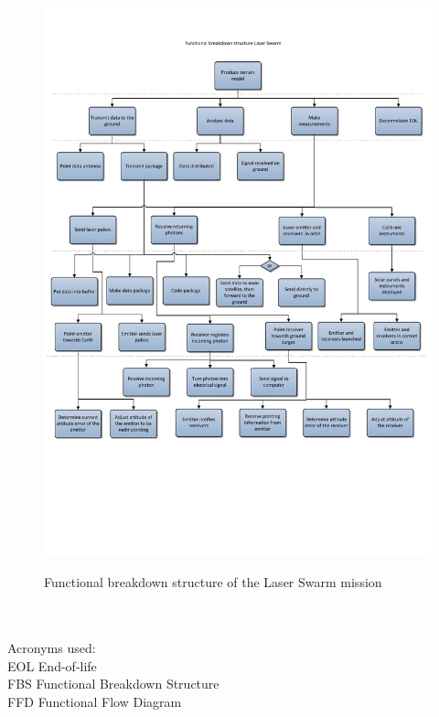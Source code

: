 \begin{figure}
\begin{center}
\includegraphics[trim = 0mm 60mm 0mm 0mm, clip, scale=0.7]{img/pic_FBS.pdf}
\label{pic_FBS}
\caption{Functional breakdown structure of the Laser Swarm mission}
\end{center}
\end{figure}

\\ \\
Acronyms used:\\
EOL End-of-life\\
FBS Functional Breakdown Structure\\
FFD Functional Flow Diagram


